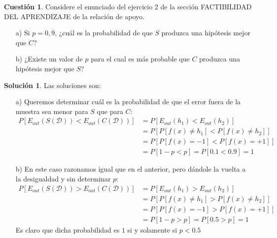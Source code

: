 \documentclass[a4paper, 11pt]{article}
\theoremstyle{definition}
\newtheorem{cuestion}{Cuestión}
\newtheorem*{solucion}{Solución}
\begin{document}
  \begin{cuestion}
  Considere el enunciado del ejercicio 2 de la sección FACTIBILIDAD DEL APRENDIZAJE de la relación de apoyo.
  \begin{enumerate}
  \item[a)] Si $p=0,9$, ¿cuál es la probabilidad de que $S$ produzca una hipótesis mejor que $C$?
  \item[b)] ¿Existe un valor de $p$ para el cual es más probable que $C$ produzca una hipótesis mejor que $S$?
  \end{enumerate}
  \end{cuestion}

  \begin{solucion}
    Las soluciones son:
    \begin{enumerate}
      \item[a)] Queremos determinar cuál es la probabilidad de que el error fuera de la muestra sea menor para $S$ que para $C$:
        \begin{equation*}
          \begin{split}
            P\left[E_{out}(S(\mathcal{D})) < E_{out}(C(\mathcal{D}))  \right] &=           P\left[E_{out}(h_1) < E_{out}(h_2)  \right] \\
            &= P\left[P\left[f(x) \neq h_1\right] < P\left[f(x) \neq h_2\right]  \right] \\
            &= P\left[P\left[f(x) = -1\right] < P\left[f(x) =+1\right]  \right] \\
            &= P\left[1-p < p \right] = P\left[0.1 < 0.9 \right] = 1
          \end{split}
        \end{equation*}
      \item[b)] En este caso  razonamos igual que en el anterior, pero dándole la vuelta a la desigualdad y sin determinar $p$:
      \begin{equation*}
        \begin{split}
          P\left[E_{out}(S(\mathcal{D})) > E_{out}(C(\mathcal{D}))  \right] &=           P\left[E_{out}(h_1) > E_{out}(h_2)  \right] \\
          &= P\left[P\left[f(x) \neq h_1\right] > P\left[f(x) \neq h_2\right]  \right] \\
          &= P\left[P\left[f(x) = -1\right] > P\left[f(x) =+1\right]  \right] \\
          &= P\left[1-p > p \right] = P\left[ 0.5 > p \right] = 1
        \end{split}
      \end{equation*}
      Es claro que dicha probabilidad es $1$ si y solamente si $p < 0.5$
    \end{enumerate}
  \end{solucion}
\end{document}
